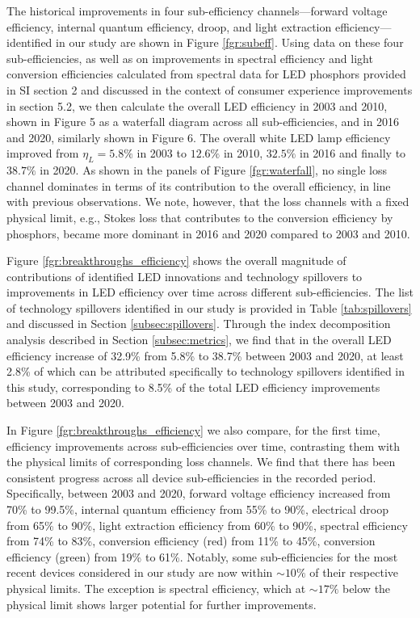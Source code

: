 \documentclass[twoside,twocolumn,9pt]{article}
\begin{document}
The historical improvements in four sub-efficiency channels—forward voltage efficiency, internal quantum efficiency, droop, and light extraction efficiency—identified in our study are shown in Figure \ref{fgr:subeff}. Using data on these four sub-efficiencies, as well as on improvements in spectral efficiency and light conversion efficiencies calculated from spectral data for LED phosphors provided in SI section 2 and discussed in the context of consumer experience improvements in section 5.2, we then calculate the overall LED efficiency in 2003 and 2010, shown in Figure 5 as a waterfall diagram across all sub-efficiencies, and in 2016 and 2020, similarly shown in Figure 6. The overall white LED lamp efficiency improved from $\eta_L=5.8\%$ in 2003 to $12.6\%$ in 2010, $32.5\%$ in 2016 and finally to $38.7\%$ in 2020. As shown in the panels of Figure \ref{fgr:waterfall}, no single loss channel dominates in terms of its contribution to the overall efficiency, in line with previous observations\cite{tsao2010solid}. We note, however, that the loss channels with a fixed physical limit, e.g., Stokes loss that contributes to the conversion efficiency by phosphors, became more dominant in 2016 and 2020 compared to 2003 and 2010. 

Figure \ref{fgr:breakthroughs_efficiency} shows the overall magnitude of contributions of identified LED innovations and technology spillovers to improvements in LED efficiency over time across different sub-efficiencies. The list of technology spillovers identified in our study is provided in Table \ref{tab:spillovers} and discussed in Section \ref{subsec:spillovers}. Through the index decomposition analysis described in Section \ref{subsec:metrics}, we find that in the overall LED efficiency increase of 32.9\% from 5.8\% to 38.7\% between 2003 and 2020, at least 2.8\% of which can be attributed specifically to technology spillovers identified in this study, corresponding to 8.5\% of the total LED efficiency improvements between 2003 and 2020.

In Figure \ref{fgr:breakthroughs_efficiency} we also compare, for the first time, efficiency improvements across sub-efficiencies over time, contrasting them with the physical limits of corresponding loss channels. We find that there has been consistent progress across all device sub-efficiencies in the recorded period. Specifically, between 2003 and 2020, forward voltage efficiency increased from 70\% to 99.5\%, internal quantum efficiency from 55\% to 90\%, electrical droop from 65\% to 90\%, light extraction efficiency from 60\% to 90\%, spectral efficiency from 74\% to 83\%, conversion efficiency (red) from 11\% to 45\%, conversion efficiency (green) from 19\% to 61\%. Notably, some sub-efficiencies for the most recent devices considered in our study are now within $\sim10\%$ of their respective physical limits. The exception is spectral efficiency, which at $\sim17\%$ below the physical limit shows larger potential for further improvements. 
\end{document}
